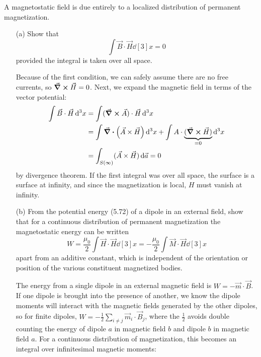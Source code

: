 \documentclass[a4paper,twoside]{article}
\begin{document}
A magnetostatic field is due entirely to a localized distribution of permanent magnetization.
\begin{itemize}
    \item[(a)] Show that
        \begin{equation}
            \int \vec{B} \cdot \vec{H} \dd[3]{x} = 0
        \end{equation}
        provided the integral is taken over all space.
        \begin{problem}
            Because of the first condition, we can safely assume there are no free currents, so $ \curl{ \vec{H}} = 0 $. Next, we expand the magnetic field in terms of the vector potential:
            \begin{align}
                \int \vec{B} \cdot \vec{H} \dd[3]{x} &= \int (\curl{ \vec{A}}) \cdot \vec{H} \dd[3]{x} \\
                &= \int \div( \vec{A} \times \vec{H}) \dd[3]{x} + \int A \cdot \underbrace{(\curl{ \vec{H}})}_{= 0} \dd[3]{x} \\
                &= \int_{S(\infty)} ( \vec{A} \times \vec{H}) \dd{ \vec{a}} = 0
            \end{align}
            by divergence theorem. If the first integral was over all space, the surface is a surface at infinity, and since the magnetization is local, $ H $ must vanish at infinity.
        \end{problem}
    \item[(b)] From the potential energy (5.72) of a dipole in an external field, show that for a continuous distribution of permanent magnetization the magnetostatic energy can be written
        \begin{equation}
            W = \frac{\mu_0}{2} \int \vec{H} \cdot \vec{H} \dd[3]{x} = - \frac{\mu_0}{2} \int \vec{M} \cdot \vec{H} \dd[3]{x}
        \end{equation}
        apart from an additive constant, which is independent of the orientation or position of the various constituent magnetized bodies.
        \begin{problem}
            The energy from a single dipole in an external magnetic field is $ W = - \vec{m} \cdot \vec{B} $. If one dipole is brought into the presence of another, we know the dipole moments will interact with the magnetic fields generated by the other dipoles, so for finite dipoles, $ W = - \frac{1}{2} \sum_{i \neq j} \vec{m}_i \cdot \vec{B}_j $, where the $ \frac{1}{2} $ avoids double counting the energy of dipole $ a $ in magnetic field $ b $ and dipole $ b $ in magnetic field $ a $. For a continuous distribution of magnetization, this becomes an integral over infinitesimal magnetic moments:

\end{problem}
\end{itemize}
\end{document}
